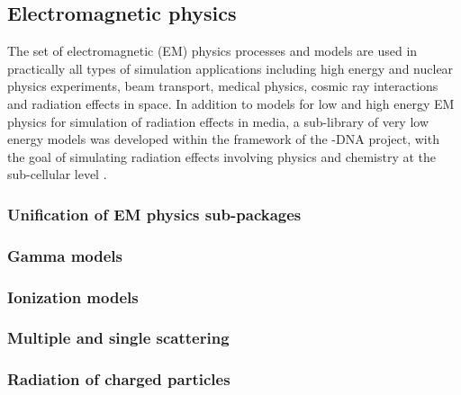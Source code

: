 \subsection{\textbf{Electromagnetic physics}}\label{sec:emphys}
The \Gfour{} set of electromagnetic (EM) physics processes and models 
\cite{bib:G4,bib:uni,embib:design} are used in practically all types of
simulation applications including high energy and nuclear physics experiments,
beam transport, medical physics, cosmic ray interactions and radiation effects
in space.  In addition to models for low and high energy EM physics for 
simulation of radiation effects in media, a sub-library of very low energy 
models was developed within the framework of the \Gfour{}-DNA project, with the
goal of simulating radiation effects involving physics and chemistry at the 
sub-cellular level \cite{embib:dna3}.

\subsubsection{Unification of EM physics sub-packages}\label{sec:em1} %
\label{sec:emuni}

\subsubsection{Gamma models}\label{sec:em2} %


\subsubsection{Ionization models}\label{sec:em3} %


\subsubsection{Multiple and single scattering}\label{sec:em4} %


\subsubsection{Radiation of charged particles}\label{sec:em5}%


